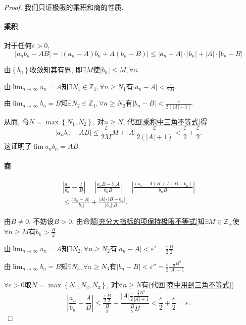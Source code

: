 \begin{proof}
    我们只证极限的乘积和商的性质.
    \paragraph{乘积}
    对于任何$\varepsilon > 0$, 
    \begin{equation}\label{乘积中三角不等式}
      |a_n b_n- AB| = |(a_n -A)b_n + A(b_n - B)| \le  |a_n-A|\cdot|b_n| + |A|\cdot |b_n -B|
    \end{equation}

    由$\left\{ b_n \right\} $收敛知其有界, 即$\exists M$使$|b_n| \le M, \forall n$.

    由$\displaystyle \lim_{n \to \infty}a_n =A$知$\exists N_1 \in \mathbb{Z}_{1}, \forall n\ge N_1$有$|a_n -A| < \frac{\varepsilon}{2M}$.

    由$\displaystyle \lim_{n \to \infty}b_n =B$知$\exists N_2 \in \mathbb{Z}_{1}, \forall n\ge N_2$有$|b_n -B| < \frac{\varepsilon}{2(|A|+1)}$.

    从而, 令$N =\max\left\{ N_1,N_2 \right\} $, 对$n\ge N$, 代回\eqref{乘积中三角不等式}得
    \begin{equation}
      |a_n b_n -AB| \le  \frac{\varepsilon}{2M} M + |A| \frac{\varepsilon}{2(|A| + 1)} < \frac{\varepsilon}{2} + \frac{\varepsilon}{2}.
    \end{equation}
    这证明了$\lim a_n b_n = AB$.

    \paragraph{商}
    \begin{gather}\label{商中用到三角不等式}
      \left| \frac{a_n}{b_n} - \frac{A}{B} \right|  = \left| \frac{a_n B - b_n A}{b_n B} \right|  = \left| \frac{(a_n-A)B + A(B -b_n)}{b_nB} \right|
      \\
      \le \frac{|a_n-A|}{|b_n|} + \frac{|A| \cdot |B - b_n|}{|b_n| |B|}.
    \end{gather}

    由$B\neq 0$, 不妨设$B>0$. 由命题\ref{充分大指标的项保持极限不等式}知$\exists M\in \mathbb{Z}_{+}$使$\forall n \ge M$有$b_n > \frac{B}{2}$

    由$\lim_{n \to \infty}a_n = A$知$\exists N_2, \forall  n\ge  N_2$有$|a_n -A| < \varepsilon' = \frac{\varepsilon}{2} \frac{B}{2} $

    由$\lim_{n \to \infty}b_n = B$知$\exists N_3, \forall n\ge N_3$有$|b_n-B| < \varepsilon'' = \frac{\varepsilon}{2} \frac{\frac{1}{2}B^2 }{|A|+1} $

    $\forall \varepsilon > 0$取$N = \max\left\{ N_1, N_2,N_3 \right\} $, 对$\forall n\ge  N$有(代回\eqref{商中用到三角不等式})
    \begin{equation}
      \left| \frac{a_n}{b_n} - \frac{A}{B} \right|  \le  \frac{\frac{\varepsilon}{2} \frac{B}{2}}{\frac{B}{2}} + \frac{|A| \frac{\varepsilon}{2} \frac{\frac{1}{2} B^2}{|A|+1}}{\frac{B}{2} B} < \frac{\varepsilon}{2} + \frac{\varepsilon}{2} = \varepsilon.
    \end{equation}
\end{proof}